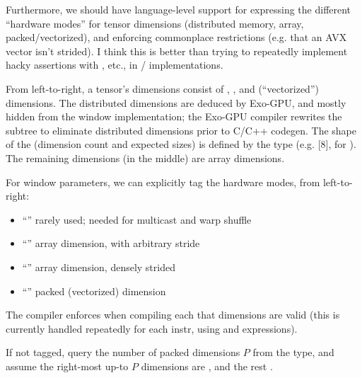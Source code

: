\filbreak
Furthermore, we should have language-level support for expressing the different ``hardware modes'' for tensor dimensions (distributed memory, array, packed/vectorized), and enforcing commonplace restrictions (e.g. that an AVX vector isn't strided).
I think this is better than trying to repeatedly implement hacky assertions with , etc., in / implementations.

\filbreak
{}

From left-to-right, a tensor's dimensions consist of , , and  (``vectorized'') dimensions.
The distributed dimensions are deduced by Exo-GPU, and mostly hidden from the window implementation; the Exo-GPU compiler rewrites the subtree to eliminate distributed dimensions prior to C/C++ codegen.
The shape of the  (dimension count and expected sizes) is defined by the  type (e.g. [8], for ).
The remaining dimensions (in the middle) are array dimensions.




\filbreak




\filbreak
For window parameters, we can explicitly tag the hardware modes, from left-to-right:
\begin{itemize}
  \item ``'' rarely used; needed for multicast and warp shuffle
  \filbreak
  \item ``'' array dimension, with arbitrary stride
  \filbreak
  \item ``'' array dimension, densely strided
  \filbreak
  \item ``'' packed (vectorized) dimension
\end{itemize}

\filbreak
The compiler enforces when compiling each  that  dimensions are valid (this is currently handled repeatedly for each instr, using  and  expressions).

\filbreak
{} If not tagged, query the number of packed dimensions $P$ from the  type, and assume the right-most up-to $P$ dimensions are , and the rest .

